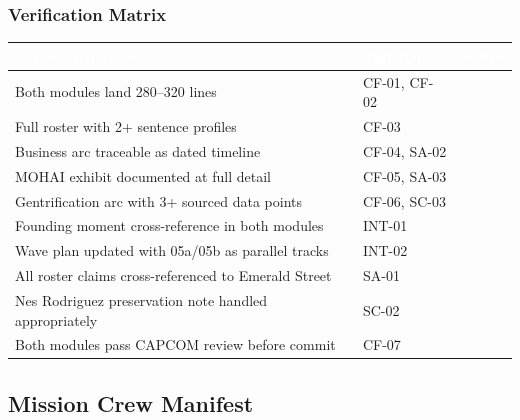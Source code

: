 \documentclass[11pt,letterpaper]{article}
\newcommand{\tableheader}[1]{\textbf{\sffamily\textcolor{white}{#1}}}
\begin{document}
\subsubsection{Verification Matrix}

\begin{center}
\begin{tabularx}{\textwidth}{L{5.5cm}L{2.5cm}C{2cm}}
\toprule
{}
\tableheader{Success Criterion} & \tableheader{Test ID(s)} & \tableheader{Status} \\
\midrule
Both modules land 280--320 lines & CF-01, CF-02 & \\
Full roster with 2+ sentence profiles & CF-03 & \\
Business arc traceable as dated timeline & CF-04, SA-02 & \\
MOHAI exhibit documented at full detail & CF-05, SA-03 & \\
Gentrification arc with 3+ sourced data points & CF-06, SC-03 & \\
Founding moment cross-reference in both modules & INT-01 & \\
Wave plan updated with 05a/05b as parallel tracks & INT-02 & \\
All roster claims cross-referenced to Emerald Street & SA-01 & \\
Nes Rodriguez preservation note handled appropriately & SC-02 & \\
Both modules pass CAPCOM review before commit & CF-07 & \\
\bottomrule
\end{tabularx}
\end{center}

\subsection{Mission Crew Manifest}
\end{document}
